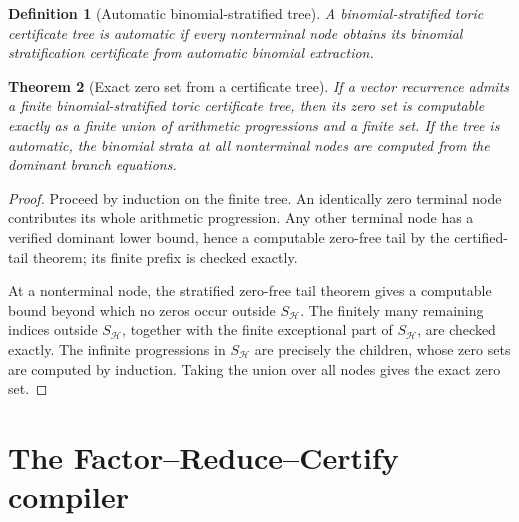 \documentclass[11pt]{article}
\newtheorem{theorem}{Theorem}[section]
\newtheorem{definition}[theorem]{Definition}
\begin{document}
\begin{definition}[Automatic binomial-stratified tree]
A binomial-stratified toric certificate tree is automatic if every nonterminal node obtains its binomial stratification certificate from automatic binomial extraction.
\end{definition}

\begin{theorem}[Exact zero set from a certificate tree]
If a vector recurrence admits a finite binomial-stratified toric certificate tree, then its zero set is computable exactly as a finite union of arithmetic progressions and a finite set. If the tree is automatic, the binomial strata at all nonterminal nodes are computed from the dominant branch equations.
\end{theorem}

\begin{proof}
Proceed by induction on the finite tree. An identically zero terminal node contributes its whole arithmetic progression. Any other terminal node has a verified dominant lower bound, hence a computable zero-free tail by the certified-tail theorem; its finite prefix is checked exactly.

At a nonterminal node, the stratified zero-free tail theorem gives a computable bound beyond which no zeros occur outside \(S_{\mathcal H}\). The finitely many remaining indices outside \(S_{\mathcal H}\), together with the finite exceptional part of \(S_{\mathcal H}\), are checked exactly. The infinite progressions in \(S_{\mathcal H}\) are precisely the children, whose zero sets are computed by induction. Taking the union over all nodes gives the exact zero set.
\end{proof}

\section{The Factor--Reduce--Certify compiler}
\end{document}
